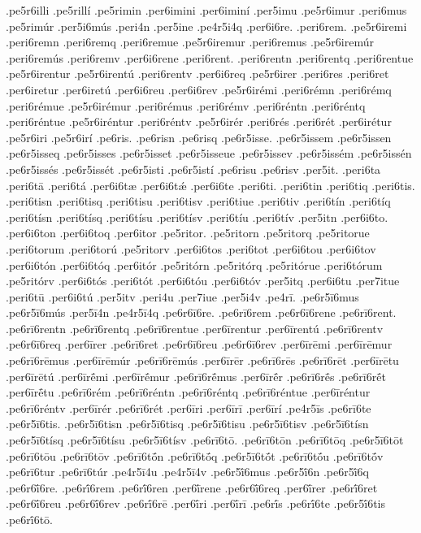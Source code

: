 {.pe5r6illi
.pe5rillí
.pe5rimin
.per6imini
.per6iminí
.per5imu
.pe5r6imur
.peri6mus
.pe5rimúr
.per5i6mús
.peri4n
.per5ine
.pe4r5i4q
.per6i6re.
.peri6rem.
.pe5r6iremi
.peri6remn
.peri6remq
.peri6remue
.pe5r6iremur
.peri6remus
.pe5r6iremúr
.peri6remús
.peri6remv
.per6i6rene
.peri6rent.
.peri6rentn
.peri6rentq
.peri6rentue
.pe5r6irentur
.pe5r6irentú
.peri6rentv
.per6i6req
.pe5r6irer
.peri6res
.peri6ret
.per6iretur
.per6iretú
.per6i6reu
.per6i6rev
.pe5r6irémi
.peri6rémn
.peri6rémq
.peri6rémue
.pe5r6irémur
.peri6rémus
.peri6rémv
.peri6réntn
.peri6réntq
.peri6réntue
.pe5r6iréntur
.peri6réntv
.pe5r6irér
.peri6rés
.peri6rét
.per6irétur
.pe5r6iri
.pe5r6irí
.pe6ris.
.pe6risn
.pe6risq
.pe6r5isse.
.pe6r5issem
.pe6r5issen
.pe6r5isseq
.pe6r5isses
.pe6r5isset
.pe6r5isseue
.pe6r5issev
.pe6r5issém
.pe6r5issén
.pe6r5issés
.pe6r5issét
.pe6r5isti
.pe6r5istí
.pe6risu
.pe6risv
.per5it.
.peri6ta
.peri6tā
.peri6tá
.per6i6tæ
.per6i6tǽ
.per6i6te
.peri6ti.
.peri6tin
.peri6tiq
.peri6tis.
.peri6tisn
.peri6tisq
.peri6tisu
.peri6tisv
.peri6tiue
.peri6tiv
.peri6tín
.peri6tíq
.peri6tísn
.peri6tísq
.peri6tísu
.peri6tísv
.peri6tíu
.peri6tív
.per5itn
.per6i6to.
.per6i6ton
.per6i6toq
.per6itor
.pe5ritor.
.pe5ritorn
.pe5ritorq
.pe5ritorue
.peri6torum
.peri6torú
.pe5ritorv
.per6i6tos
.peri6tot
.per6i6tou
.per6i6tov
.per6i6tón
.per6i6tóq
.per6itór
.pe5ritórn
.pe5ritórq
.pe5ritórue
.peri6tórum
.pe5ritórv
.per6i6tós
.peri6tót
.per6i6tóu
.per6i6tóv
.per5itq
.per6i6tu
.per7itue
.peri6tū
.per6i6tú
.per5itv
.peri4u
.per7iue
.per5i4v
.pe4rī.
.pe6r5ī6mus
.pe6r5ī6mús
.per5ī4n
.pe4r5ī4q
.pe6r6ī6re.
.pe6rī6rem
.pe6r6ī6rene
.pe6rī6rent.
.pe6rī6rentn
.pe6rī6rentq
.pe6rī6rentue
.per6īrentur
.per6īrentú
.pe6rī6rentv
.pe6r6ī6req
.per6īrer
.pe6rī6ret
.pe6r6ī6reu
.pe6r6ī6rev
.per6īrēmi
.per6īrēmur
.pe6rī6rēmus
.per6īrēmúr
.pe6rī6rēmús
.per6īrēr
.pe6rī6rēs
.pe6rī6rēt
.per6īrētu
.per6īrētú
.per6īrḗmi
.per6īrḗmur
.pe6rī6rḗmus
.per6īrḗr
.pe6rī6rḗs
.pe6rī6rḗt
.per6īrḗtu
.pe6rī6rém
.pe6rī6réntn
.pe6rī6réntq
.pe6rī6réntue
.per6īréntur
.pe6rī6réntv
.per6īrér
.pe6rī6rét
.per6īri
.per6īrī
.per6īrí
.pe4r5īs
.pe6rī6te
.pe6r5ī6tis.
.pe6r5ī6tisn
.pe6r5ī6tisq
.pe6r5ī6tisu
.pe6r5ī6tisv
.pe6r5ī6tísn
.pe6r5ī6tísq
.pe6r5ī6tísu
.pe6r5ī6tísv
.pe6rī6tō.
.pe6rī6tōn
.pe6rī6tōq
.pe6r5ī6tōt
.pe6rī6tōu
.pe6rī6tōv
.pe6rī6tṓn
.pe6rī6tṓq
.pe6r5ī6tṓt
.pe6rī6tṓu
.pe6rī6tṓv
.pe6rī6tur
.pe6rī6túr
.pe4r5ī4u
.pe4r5ī4v
.pe6r5ī́6mus
.pe6r5ī́6n
.pe6r5ī́6q
.pe6r6ī́6re.
.pe6rī́6rem
.pe6rī́6ren
.per6ī́rene
.pe6r6ī́6req
.per6ī́rer
.pe6rī́6ret
.pe6r6ī́6reu
.pe6r6ī́6rev
.pe6rī́6rē
.per6ī́ri
.per6ī́rī
.pe6rī́s
.pe6rī́6te
.pe6r5ī́6tis
.pe6rī́6tō.
}
